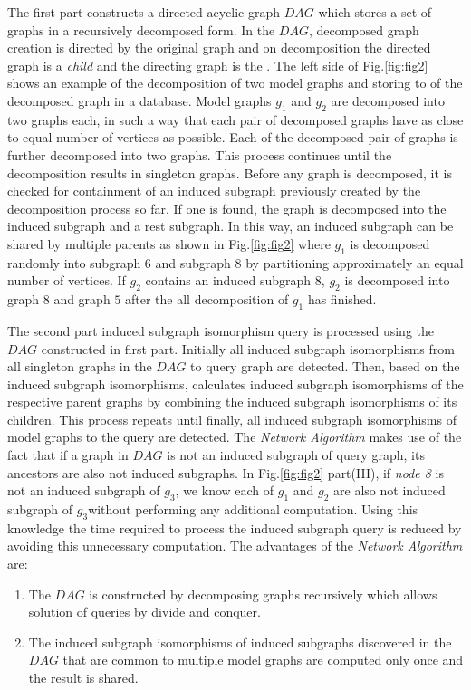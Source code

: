 The first part constructs a directed acyclic graph $DAG$ which stores a set of graphs in a recursively decomposed form.
In the $DAG$,  decomposed graph creation is directed by the original graph and on decomposition 
the directed graph is a \textit{child} and the directing graph is the . 
The left side of Fig.\ref{fig:fig2} shows an example of the decomposition of two model graphs and storing to of the decomposed graph in a database.
Model graphs $g_1$ and $g_2$ are decomposed into two graphs each, in such a way that each pair of decomposed graphs have as close to equal number of vertices  as possible.
Each of the decomposed pair of graphs is further decomposed into two graphs.
This process continues until the decomposition results in singleton graphs.
Before any graph is decomposed, it is checked for containment of an induced subgraph previously created by the decomposition process so far. If one is found, the graph is decomposed into the induced subgraph and a rest subgraph. In this way, an induced subgraph can be shared by multiple parents as shown in Fig.\ref{fig:fig2} where $g_1$ is decomposed randomly into subgraph $6$ and subgraph $8$ by partitioning approximately an equal number of vertices.
If $g_2$ contains an induced subgraph $8$, $g_2$ is decomposed into graph $8$ and graph $5$ after the all decomposition of $g_1$ has finished.

The second part induced subgraph isomorphism query is processed using the $DAG$ constructed in first part.
Initially all induced subgraph isomorphisms from all singleton graphs in the $DAG$ to query graph are detected.
Then, based on the induced subgraph isomorphisms, calculates induced subgraph isomorphisms of the respective parent graphs by combining the induced subgraph isomorphisms of its children. This process repeats until finally, all induced subgraph isomorphisms of model graphs to the query are detected.
The \textit{Network Algorithm} makes use of the fact that if a graph in $DAG$ is not an induced subgraph of query graph, its ancestors are also not induced subgraphs.
In Fig.\ref{fig:fig2} part(III), if \textit{node 8} is not an induced subgraph of $g_3$, we know each of $g_1$ and $g_2$ are also not induced subgraph of $g_3$without performing any additional computation. Using this knowledge the time required to process the induced subgraph query is reduced by avoiding this unnecessary computation. The advantages of the \textit{Network Algorithm}  are:  

\begin{enumerate}
\item The $DAG$ is constructed by decomposing graphs recursively which allows solution of queries by divide and conquer.
\item The induced subgraph isomorphisms of induced subgraphs discovered in the $DAG$ that are common to multiple model graphs are computed only once and the result is shared.
\end{enumerate}

